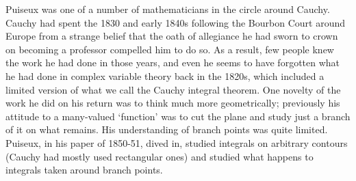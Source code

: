 \documentclass[11pt]{book}
\begin{document}
Puiseux was one of a number of mathematicians in the circle around Cauchy. Cauchy had spent the 1830 and early 1840s following the Bourbon Court around Europe from a strange belief that the oath of allegiance he had sworn to crown on becoming a professor compelled him to do so. As a result, few people knew the work he had done in those years, and even he seems to have forgotten what he had done in complex variable theory back in the 1820s, which included a limited version of what we call the Cauchy integral theorem. One novelty of the work he did on his return was to think much more geometrically; previously his attitude to a many-valued `function' was to cut the plane and study just a branch of it on what remains. His understanding of branch points was quite limited. Puiseux, in his paper of 1850-51, dived in, studied integrals on arbitrary contours (Cauchy had mostly used rectangular ones) and studied what happens to integrals taken around branch points.                                                                                                                                                                                                                                                                                                                                                                                                                                                                                                                                                                                                                                                                                                                                                                                                                                                                                                                                                                                                                                                                                                            
\end{document}
